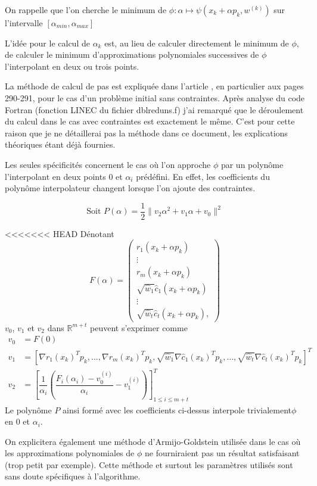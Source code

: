 \documentclass[a4paper,11pt]{article}
\newcommand{\hc}{\hat{c}}
\numberwithin{equation}{section}
\begin{document}
On rappelle que l'on cherche le minimum de $\phi: \alpha \mapsto \psi(x_{k}+\alpha p_{k},w^{(k)})$ sur l'intervalle $[\alpha_{min},\alpha_{max}]$

L'idée pour le calcul de $\alpha_{k}$ est, au lieu de calculer directement le minimum de $\phi$, de calculer le minimum d'approximations polynomiales successives de $\phi$ l'interpolant en deux ou trois points. 

La méthode de calcul de pas est expliquée dans l'article \cite{lindstromwedin1984}, en particulier aux pages 290-291, pour le cas d'un problème initial sans contraintes. Après analyse du code Fortran (fonction LINEC du fichier dblreduns.f) j'ai remarqué que le déroulement du calcul dans le cas avec contraintes est exactement le même. C'est pour cette raison que je ne détaillerai pas la méthode dans ce document, les explications théoriques étant déjà fournies.


Les seules spécificités concernent le cas où l'on approche $\phi$ par un polynôme l'interpolant en deux points $0$ et $\alpha_{i}$ prédéfini. En effet, les coefficients du polynôme interpolateur changent lorsque l'on ajoute des contraintes.

$$\text{Soit }P(\alpha) = \dfrac{1}{2}\|v_2\alpha^2 + v_1\alpha + v_0\|^2$$

<<<<<<< HEAD
Dénotant
$$
F(\alpha) = \begin{pmatrix}
r_1(x_{k}+\alpha p_{k}) \\
\vdots \\
r_m(x_{k}+\alpha p_{k}) \\
\sqrt{\hat{w}_1}\hc_1(x_{k}+\alpha p_{k}) \\
\vdots \\
\sqrt{\hat{w}_t}\hc_t(x_{k}+\alpha p_{k}),
\end{pmatrix}
$$
$v_0$, $v_1$ et $v_2$ dans $\mathbb{R}^{m+t}$ peuvent s'exprimer comme
\begin{align*} 
v_0 &= F(0) \\
v_1 &= \left[\nabla r_1(x_{k})^Tp_{k},\ldots, \nabla r_m(x_{k})^Tp_{k}, \sqrt{\hat{w}_1}\nabla \hc_1(x_{k})^Tp_{k}, \ldots, \sqrt{\hat{w}_t}\nabla \hc_t(x_{k})^Tp_{k} \right]^T\\
v_2 &= \left[ \dfrac{1}{\alpha_i}\left( \dfrac{F_i(\alpha_i) - v_0^{(i)}}{\alpha_i} - v_1^{(i)}\right)\right]_{1 \leq i \leq m+t}^T
\end{align*}
Le polynôme $P$ ainsi formé avec les coefficients ci-dessus interpole trivialement$\phi$ en $0$ et $\alpha_i$.

On explicitera également une méthode d'Armijo-Goldstein utilisée dans le cas où les approximations polynomiales de $\phi$ ne fourniraient pas un résultat satisfaisant (trop petit par exemple). Cette méthode et surtout les paramètres utilisés sont sans doute spécifiques à l'algorithme. 
\end{document}
